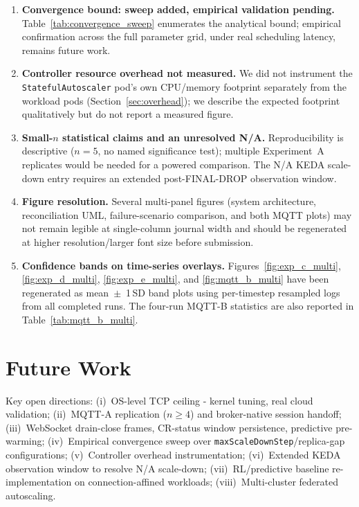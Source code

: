 \documentclass[3p,twocolumn]{elsarticle}
\theoremstyle{plain}%
\theoremstyle{definition}%
\begin{document}
\begin{enumerate}[leftmargin=*]
\item \textbf{Convergence bound: sweep added, empirical validation pending.} Table~\ref{tab:convergence_sweep} enumerates the analytical bound; empirical confirmation across the full parameter grid, under real scheduling latency, remains future work.

\item \textbf{Controller resource overhead not measured.} We did not instrument the \texttt{StatefulAutoscaler} pod's own CPU/memory footprint separately from the workload pods (Section~\ref{sec:overhead}); we describe the expected footprint qualitatively but do not report a measured figure.

\item \textbf{Small-$n$ statistical claims and an unresolved N/A.} Reproducibility is descriptive ($n=5$, no named significance test); multiple Experiment~A replicates would be needed for a powered comparison. The N/A KEDA scale-down entry requires an extended post-FINAL-DROP observation window.

\item \textbf{Figure resolution.} Several multi-panel figures (system architecture, reconciliation UML, failure-scenario comparison, and both MQTT plots) may not remain legible at single-column journal width and should be regenerated at higher resolution/larger font size before submission.

\item \textbf{Confidence bands on time-series overlays.} Figures~\ref{fig:exp_c_multi}, \ref{fig:exp_d_multi}, \ref{fig:exp_e_multi}, and \ref{fig:mqtt_b_multi} have been regenerated as mean~$\pm$~1\,SD band plots using per-timestep resampled logs from all completed runs. The four-run MQTT-B statistics are also reported in Table~\ref{tab:mqtt_b_multi}.

\end{enumerate}



\FloatBarrier
\section{Future Work}
\label{sec:future_work}

Key open directions: (i)~OS-level TCP ceiling - kernel tuning, real cloud validation; (ii)~MQTT-A replication ($n\geq4$) and broker-native session handoff; (iii)~WebSocket drain-close frames, CR-status window persistence, predictive pre-warming; (iv)~Empirical convergence sweep over \texttt{maxScaleDownStep}/replica-gap configurations; (v)~Controller overhead instrumentation; (vi)~Extended KEDA observation window to resolve N/A scale-down; (vii)~RL/predictive baseline re-implementation on connection-affined workloads; (viii)~Multi-cluster federated autoscaling.
\end{document}
